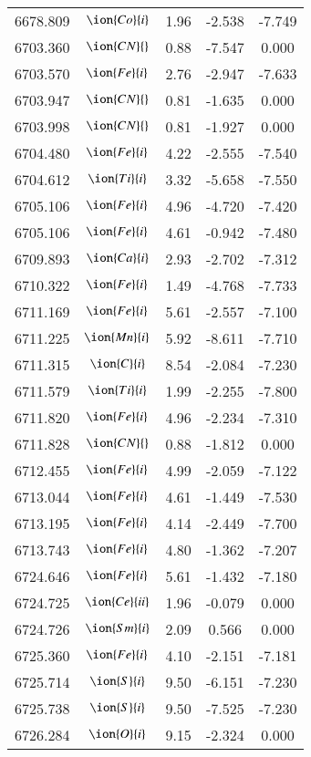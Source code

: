 \documentclass[fleqn,usenatbib]{mnras}
\begin{document}
\begin{center}
\begin{table}
\begin{tabular}{ccccc}
6678.809 &  $\ion{Co}{i}$  & 1.96 & -2.538 & -7.749 \\ 
6703.360 & $\ion{CN}{}$ & 0.88 & -7.547 & 0.000 \\ 
6703.570 &  $\ion{Fe}{i}$  & 2.76 & -2.947 & -7.633 \\ 
6703.947 & $\ion{CN}{}$ & 0.81 & -1.635 & 0.000 \\ 
6703.998 & $\ion{CN}{}$ & 0.81 & -1.927 & 0.000 \\ 
6704.480 &  $\ion{Fe}{i}$  & 4.22 & -2.555 & -7.540 \\ 
6704.612 &  $\ion{Ti}{i}$  & 3.32 & -5.658 & -7.550 \\ 
6705.106 &  $\ion{Fe}{i}$  & 4.96 & -4.720 & -7.420 \\ 
6705.106 &  $\ion{Fe}{i}$  & 4.61 & -0.942 & -7.480 \\ 
6709.893 &  $\ion{Ca}{i}$  & 2.93 & -2.702 & -7.312 \\ 
6710.322 &  $\ion{Fe}{i}$  & 1.49 & -4.768 & -7.733 \\ 
6711.169 &  $\ion{Fe}{i}$  & 5.61 & -2.557 & -7.100 \\ 
6711.225 &  $\ion{Mn}{i}$  & 5.92 & -8.611 & -7.710 \\ 
6711.315 &  $\ion{C}{i}$  & 8.54 & -2.084 & -7.230 \\ 
6711.579 &  $\ion{Ti}{i}$  & 1.99 & -2.255 & -7.800 \\ 
6711.820 &  $\ion{Fe}{i}$  & 4.96 & -2.234 & -7.310 \\ 
6711.828 & $\ion{CN}{}$ & 0.88 & -1.812 & 0.000 \\ 
6712.455 &  $\ion{Fe}{i}$  & 4.99 & -2.059 & -7.122 \\ 
6713.044 &  $\ion{Fe}{i}$  & 4.61 & -1.449 & -7.530 \\ 
6713.195 &  $\ion{Fe}{i}$  & 4.14 & -2.449 & -7.700 \\ 
6713.743 &  $\ion{Fe}{i}$  & 4.80 & -1.362 & -7.207 \\ 
6724.646 &  $\ion{Fe}{i}$  & 5.61 & -1.432 & -7.180 \\ 
6724.725 &  $\ion{Ce}{ii}$  & 1.96 & -0.079 & 0.000 \\ 
6724.726 &  $\ion{Sm}{i}$  & 2.09 & 0.566 & 0.000 \\ 
6725.360 &  $\ion{Fe}{i}$  & 4.10 & -2.151 & -7.181 \\ 
6725.714 &  $\ion{S}{i}$  & 9.50 & -6.151 & -7.230 \\ 
6725.738 &  $\ion{S}{i}$  & 9.50 & -7.525 & -7.230 \\ 
6726.284 &  $\ion{O}{i}$  & 9.15 & -2.324 & 0.000 \\ 

\end{tabular}
\end{table}
\end{center}
\end{document}
